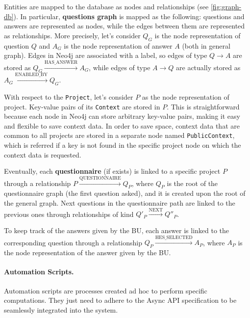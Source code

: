 \documentclass[12pt,a4paper,openright,twoside]{book}
\begin{document}
Entities are mapped to the database as nodes and relationships (see \cref{fig:graph-db}).
%
In particular, \textbf{questions graph} is mapped as the following: questions and answers are represented as nodes, while the edges between them are represented as relationships.
%
More precisely, let's consider $Q_G$ is the node representation of question $Q$ and $A_G$ is the node representation of answer $A$ (both in general graph).
%
Edges in Neo4j are associated with a label, so edges of type $Q \to A$ are stored as $Q_G \xrightarrow{\text{HAS\_ANSWER}} A_G$, while edges of type $A \to Q$ are actually stored as $A_G \xrightarrow{\text{ENABLED\_BY}} Q_G$.


With respect to the \texttt{Project}, let's consider $P$ as the node representation of project.
%
Key-value pairs of its \texttt{Context} are stored in $P$.
%
This is straightforward because each node in Neo4j can store arbitrary key-value pairs, making it easy and flexible to save context data.
%
In order to save space, context data that are common to all projects are stored in a separate node named \texttt{PublicContext}, which is referred if a key is not found in the specific project node on which the context data is requested.

Eventually, each \textbf{questionnaire} (if exists) is linked to a specific project $P$ through a relationship $P \xrightarrow{\text{QUESTIONNAIRE}} Q_P$, where $Q_P$ is the root of the questionnaire graph (the first question asked), and it is created upon the root of the general graph.
%
Next questions in the questionnaire path are linked to the previous ones through relationships of kind $Q'_P \xrightarrow{\text{NEXT}} Q''_P$.

To keep track of the answers given by the \ac{BU}, each answer is linked to the corresponding question through a relationship $Q_P \xrightarrow{\text{HES\_SELECTED}} A_P$, where $A_P$ is the node representation of the answer given by the \ac{BU}.

\paragraph{Automation Scripts.}

Automation scripts are processes created ad hoc to perform specific computations.
%
They just need to adhere to the Async API specification to be seamlessly integrated into the system.
%
\end{document}
